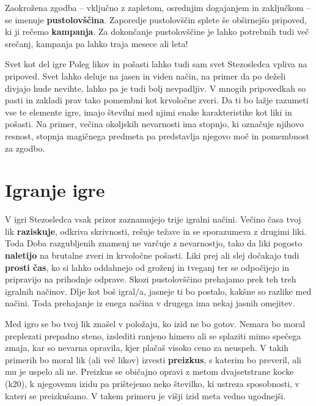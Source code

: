 Zaokrožena zgodba -- vključno z zapletom, osrednjim dogajanjem in zaključkom -- se imenuje \textbf{pustolovščina}. Zaporedje pustolovščin splete še obširnejšo pripoved, ki ji rečemo \textbf{kampanja}. Za dokončanje pustolovščine je lahko potrebnih tudi več srečanj, kampanja pa lahko traja mesece ali leta!

\begin{rpg-titlebox}{Svet kot del igre}
    Poleg likov in pošasti lahko tudi sam svet Stezosledca vpliva na pripoved. Svet lahko deluje na jasen in viden način, na primer da po deželi divjajo hude nevihte, lahko pa je tudi bolj nevpadljiv. V mnogih pripovedkah so pasti in zakladi prav tako pomembni kot krvoločne zveri. Da ti bo lažje razumeti vse te elemente igre, imajo številni med njimi enake karakteristike kot liki in pošasti. Na primer, večina okoljskih nevarnosti ima stopnjo, ki označuje njihovo resnost, stopnja magičnega predmeta pa predstavlja njegovo moč in pomembnost za zgodbo.
\end{rpg-titlebox}

\section{Igranje igre}

V igri Stezosledca vsak prizor zaznamujejo trije igralni načini. Večino časa tvoj lik \textbf{raziskuje}, odkriva skrivnosti, rešuje težave in se sporazumeva z drugimi liki. Toda Doba razgubljenih znamenj ne varčuje z nevarnostjo, tako da liki pogosto \textbf{naletijo} na brutalne zveri in krvoločne pošasti. Liki prej ali slej dočakajo tudi \textbf{prosti čas}, ko si lahko oddahnejo od groženj in tveganj ter se odpočijejo in pripravijo na prihodnje odprave. Skozi pustolovščino prehajamo prek teh treh igralnih načinov. Dlje kot boš igral/a, jasneje ti bo postalo, kakšne so razlike med načini. Toda prehajanje iz enega načina v drugega ima nekaj jasnih omejitev.

Med igro se bo tvoj lik znašel v položaju, ko izid ne bo gotov. Nemara bo moral preplezati prepadno steno, izslediti ranjeno himero ali se splaziti mimo spečega zmaja, kar so nevarna opravila, kjer plačaš visoko ceno za neuspeh. V takih primerih bo moral lik (ali več likov) izvesti \textbf{preizkus}, s katerim bo preveril, ali mu je uspelo ali ne. Preizkus se običajno opravi z metom dvajsetstrane kocke (k20), k njegovemu izidu pa prištejemo neko številko, ki ustreza sposobnosti, v kateri se preizkušamo. V takem primeru je višji izid meta vedno ugodnejši.

